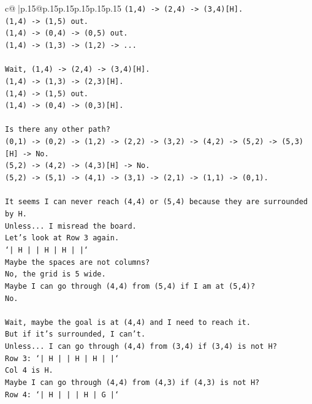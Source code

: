 \documentclass{article}
\begin{document}
{\begin{supertabular}{c@{$\;$}|p{.15\linewidth}@{}p{.15\linewidth}p{.15\linewidth}p{.15\linewidth}p{.15\linewidth}p{.15\linewidth}}
{{{\texttt{(1,4) {-}> (2,4) {-}> (3,4){[}H{]}.} \\
\texttt{(1,4) {-}> (1,5) out.} \\
\texttt{(1,4) {-}> (0,4) {-}> (0,5) out.} \\
\texttt{(1,4) {-}> (1,3) {-}> (1,2) {-}> ...} \\
\\ 
\texttt{Wait, (1,4) {-}> (2,4) {-}> (3,4){[}H{]}.} \\
\texttt{(1,4) {-}> (1,3) {-}> (2,3){[}H{]}.} \\
\texttt{(1,4) {-}> (1,5) out.} \\
\texttt{(1,4) {-}> (0,4) {-}> (0,3){[}H{]}.} \\
\\ 
\texttt{Is there any other path?} \\
\texttt{(0,1) {-}> (0,2) {-}> (1,2) {-}> (2,2) {-}> (3,2) {-}> (4,2) {-}> (5,2) {-}> (5,3){[}H{]} {-}> No.} \\
\texttt{(5,2) {-}> (4,2) {-}> (4,3){[}H{]} {-}> No.} \\
\texttt{(5,2) {-}> (5,1) {-}> (4,1) {-}> (3,1) {-}> (2,1) {-}> (1,1) {-}> (0,1).} \\
\\ 
\texttt{It seems I can never reach (4,4) or (5,4) because they are surrounded by H.} \\
\texttt{Unless... I misread the board.} \\
\texttt{Let's look at Row 3 again.} \\
\texttt{`|  H  |     |  H  |  H  |     |`} \\
\texttt{Maybe the spaces are not columns?} \\
\texttt{No, the grid is 5 wide.} \\
\texttt{Maybe I can go through (4,4) from (5,4) if I am at (5,4)?} \\
\texttt{No.} \\
\\ 
\texttt{Wait, maybe the goal is at (4,4) and I need to reach it.} \\
\texttt{But if it's surrounded, I can't.} \\
\texttt{Unless... I can go through (4,4) from (3,4) if (3,4) is not H?} \\
\texttt{Row 3: `|  H  |     |  H  |  H  |     |`} \\
\texttt{Col 4 is H.} \\
\texttt{Maybe I can go through (4,4) from (4,3) if (4,3) is not H?} \\
\texttt{Row 4: `|  H  |     |     |  H  |  G  |`} \\
}}}
\end{supertabular}}
\end{document}
